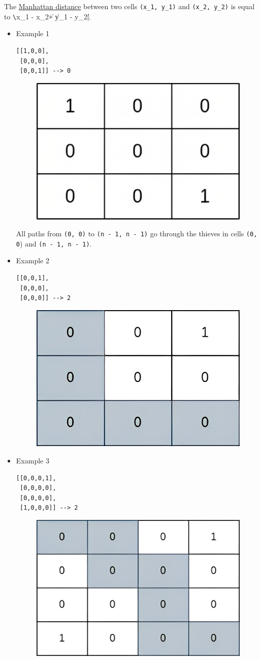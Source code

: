 The \ul{Manhattan distance} between two cells {\colorbox{CodeBackground}{\lstinline|(x_1, y_1)|}} and {\colorbox{CodeBackground}{\lstinline|(x_2, y_2)|}} is equal to {\colorbox{CodeBackground}{\lstinline|\|x_1 - x_2\| + \|y_1 - y_2\||}}. 

\begin{itemize}
\item Example 1
\begin{lstlisting}
[[1,0,0],
 [0,0,0],
 [0,0,1]] --> 0
\end{lstlisting}
\begin{figure}[H]
\centering
\includegraphics[width=0.2\linewidth]{images/lc2812_eg1}
\label{fig:lc2812eg1}
\end{figure}
All paths from {\colorbox{CodeBackground}{\lstinline|(0, 0)|}} to {\colorbox{CodeBackground}{\lstinline|(n - 1, n - 1)|}} go through the thieves in cells {\colorbox{CodeBackground}{\lstinline|(0, 0|}}) and {\colorbox{CodeBackground}{\lstinline|(n - 1, n - 1)|}}.
	\item Example 2
\begin{lstlisting}
[[0,0,1],
 [0,0,0],
 [0,0,0]] --> 2
\end{lstlisting}
\begin{figure}[H]
\centering
\includegraphics[width=0.2\linewidth]{images/lc2812_eg2}
\label{fig:lc2812eg2}
\end{figure}
\item Example 3
\begin{lstlisting}
[[0,0,0,1],
 [0,0,0,0],
 [0,0,0,0],
 [1,0,0,0]] --> 2
\end{lstlisting}
\begin{figure}[H]
\centering
\includegraphics[width=0.26\linewidth]{images/lc2812_eg3}
\label{fig:lc2812eg3}
\end{figure}
\end{itemize}

